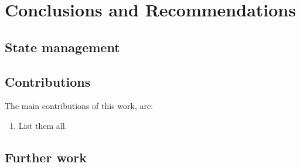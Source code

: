 \chapter{Conclusions and Recommendations}
\label{chp:CONC}

\section{State management}


\section{Contributions}
\label{contributions}

The main contributions of this work, are:
\begin{enumerate}
\item List them all.
\end{enumerate}

\section{Further work}
\label{further_work}
